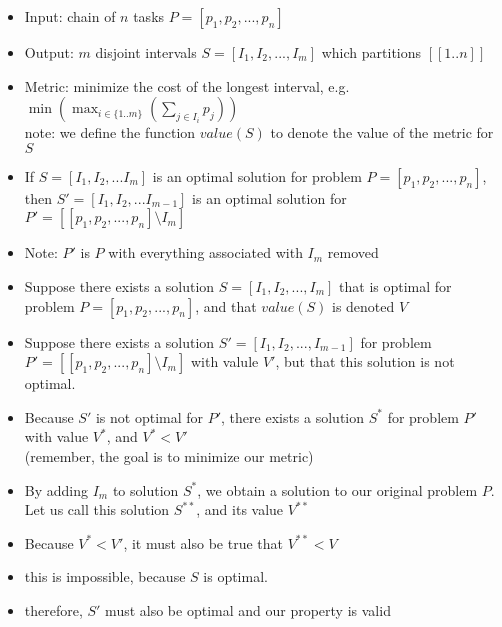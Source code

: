 \documentclass[landscape]{slides}
\begin{document}

\begin{slide} %
	\begin{itemize}
    \item Input: chain of $n$ tasks $P = [p_1, p_2, ..., p_n]$
    \item Output: $m$ disjoint intervals  $S = [I_1, I_2, ..., I_m]$ which
    			partitions $[[1..n]]$
    \item Metric: minimize the cost of the longest interval, e.g.
					$\min(\max_{i\in\{1..m\}}(\sum_{j \in{I_i}} p_j))$
					\\note: we define the function $value (S)$ to denote the value of 
					the metric for $S$
	\end{itemize}
\end{slide}

\begin{slide} %
	\begin{itemize}
	\item If $S = [I_1, I_2, ... I_m]$ is an optimal solution for problem 
	$P = [p_1, p_2, ..., p_n]$, then $S' = [I_1, I_2, ... I_{m-1}]$ is an optimal
	solution for $P' = [[p_1, p_2, ..., p_n] \setminus I_m]$
	\item Note: $P'$ is $P$ with everything associated with $I_m$ removed
	\end{itemize}
\end{slide}

\begin{slide} %
	\begin{itemize}
		\item Suppose there exists a solution 
		$S = [I_1, I_2, ..., I_m]$ that is optimal for problem 
		$P = [p_1, p_2, ..., p_n]$, and that $value(S)$ is denoted $V$
		\item Suppose there exists a solution $S' = [I_1, I_2, ..., I_{m-1}]$ for
		problem $P'= [[p_1, p_2, ..., p_n] \setminus I_m]$ with valule $V'$, but
		that this solution is not optimal.
		\item Because $S'$ is not optimal for $P'$, there exists a solution $S^*$
		for problem $P'$ with value $V^*$, and $V^* < V'$ \\(remember, the goal is
		to minimize our metric) 
	\end{itemize}
\end{slide}

\begin{slide} %
	\begin{itemize}
		\item By adding $I_m$ to solution $S^*$, we obtain a solution to our
		original problem $P$. Let us call this solution $S^{**}$, and its value
		$V^{**}$

		\item Because $V^{*} < V'$, it must also be true that $V^{**} < V$

		\item this is impossible, because $S$ is optimal. 
		\item therefore, $S'$ must also be optimal and our property is valid
	\end{itemize}
\end{slide}
\end{document}
